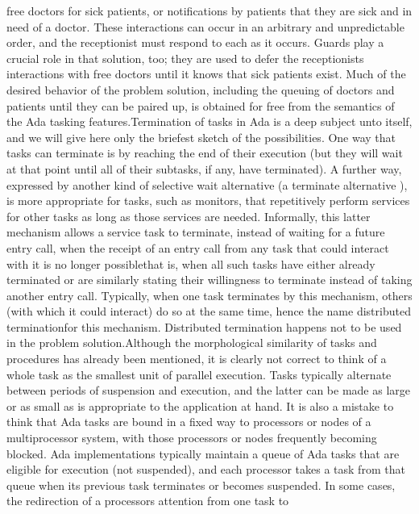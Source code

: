 free doctors for sick patients, or notifications by patients that
they are sick and in need of a doctor. These interactions can occur
in an arbitrary and unpredictable order, and the receptionist must
respond to each as it occurs. Guards play a crucial role in that solution,
too; they are used to defer the receptionist\rsquo[]s interactions
with free doctors until it knows that sick patients exist. Much of
the desired behavior of the problem solution, including the queuing
of doctors and patients until they can be paired up, is obtained for
free from the semantics of the Ada tasking features.\Endpara[]
\Para[]Termination of tasks in Ada is a deep subject unto itself,
and we will give here only the briefest sketch of the possibilities.
One way that tasks can terminate is by reaching the end of their execution
(but they will wait at that point until all of their subtasks, if
any, have terminated). A further way, expressed by another kind of
selective wait alternative (a \txtxemph[]terminate alternative%
\txtxendemph[]), is more appropriate for tasks, such as monitors,
that repetitively perform services for other tasks as long as those
services are needed. Informally, this latter mechanism allows a service
task to terminate, instead of waiting for a future entry call, when
the receipt of an entry call from any task that could interact with
it is no longer possible\EmDash[]that is, when all such tasks have
either already terminated or are similarly stating their willingness
to terminate instead of taking another entry call. Typically, when
one task terminates by this mechanism, others (with which it could
interact) do so at the same time, hence the name \ldquo[]distributed
termination\rdquo[] for this mechanism. Distributed termination
happens not to be used in the problem solution.\Endpara[]
\Para[]Although the morphological similarity of tasks and procedures
has already been mentioned, it is clearly not correct to think of
a whole task as the smallest unit of parallel execution. Tasks typically
alternate between periods of suspension and execution, and the latter
can be made as large or as small as is appropriate to the application
at hand. It is also a mistake to think that Ada tasks are bound in
a fixed way to processors or nodes of a multiprocessor system, with
those processors or nodes frequently becoming blocked. Ada implementations
typically maintain a queue of Ada tasks that are eligible for execution
(not suspended), and each processor takes a task from that queue when
its previous task terminates or becomes suspended. In some cases,
the redirection of a processor\rsquo[]s attention from one task to
